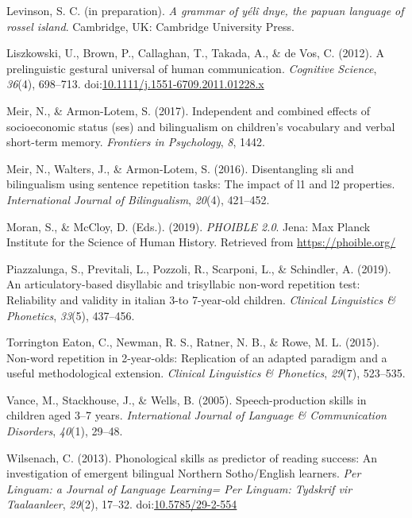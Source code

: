 \documentclass[english,,man,floatsintext]{apa6}
\begin{document}
\hypertarget{ref-levinsoninprepydgrammar}{}
Levinson, S. C. (in preparation). \emph{A grammar of yélî dnye, the
papuan language of rossel island}. Cambridge, UK: Cambridge University
Press.

\hypertarget{ref-liszkowski2012prelinguistic}{}
Liszkowski, U., Brown, P., Callaghan, T., Takada, A., \& de Vos, C.
(2012). A prelinguistic gestural universal of human communication.
\emph{Cognitive Science}, \emph{36}(4), 698--713.
doi:\href{https://doi.org/10.1111/j.1551-6709.2011.01228.x}{10.1111/j.1551-6709.2011.01228.x}

\hypertarget{ref-meir2017independent}{}
Meir, N., \& Armon-Lotem, S. (2017). Independent and combined effects of
socioeconomic status (ses) and bilingualism on children's vocabulary and
verbal short-term memory. \emph{Frontiers in Psychology}, \emph{8},
1442.

\hypertarget{ref-meir2016disentangling}{}
Meir, N., Walters, J., \& Armon-Lotem, S. (2016). Disentangling sli and
bilingualism using sentence repetition tasks: The impact of l1 and l2
properties. \emph{International Journal of Bilingualism}, \emph{20}(4),
421--452.

\hypertarget{ref-phoible}{}
Moran, S., \& McCloy, D. (Eds.). (2019). \emph{PHOIBLE 2.0}. Jena: Max
Planck Institute for the Science of Human History. Retrieved from
\url{https://phoible.org/}

\hypertarget{ref-piazzalunga2019articulatory}{}
Piazzalunga, S., Previtali, L., Pozzoli, R., Scarponi, L., \& Schindler,
A. (2019). An articulatory-based disyllabic and trisyllabic non-word
repetition test: Reliability and validity in italian 3-to 7-year-old
children. \emph{Clinical Linguistics \& Phonetics}, \emph{33}(5),
437--456.

\hypertarget{ref-torrington2015non}{}
Torrington Eaton, C., Newman, R. S., Ratner, N. B., \& Rowe, M. L.
(2015). Non-word repetition in 2-year-olds: Replication of an adapted
paradigm and a useful methodological extension. \emph{Clinical
Linguistics \& Phonetics}, \emph{29}(7), 523--535.

\hypertarget{ref-vance2005speech}{}
Vance, M., Stackhouse, J., \& Wells, B. (2005). Speech-production skills
in children aged 3--7 years. \emph{International Journal of Language \&
Communication Disorders}, \emph{40}(1), 29--48.

\hypertarget{ref-wilsenach2013phonological}{}
Wilsenach, C. (2013). Phonological skills as predictor of reading
success: An investigation of emergent bilingual Northern Sotho/English
learners. \emph{Per Linguam: a Journal of Language Learning= Per
Linguam: Tydskrif vir Taalaanleer}, \emph{29}(2), 17--32.
doi:\href{https://doi.org/10.5785/29-2-554}{10.5785/29-2-554}
\end{document}
